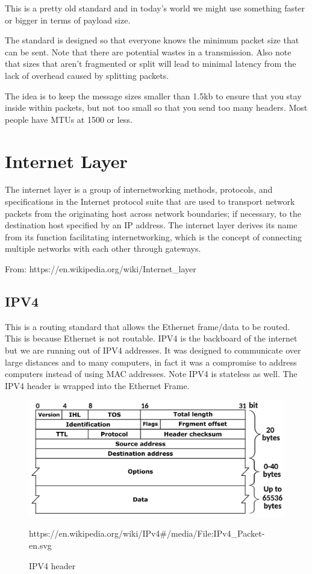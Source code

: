 \documentclass[../CMPUT-404-Notes.tex]{subfiles}
\begin{document}
\begin{Note}
  This is a pretty old standard and in today's world we might use something faster or bigger in terms of payload size.  
\end{Note}

The standard is designed so that everyone knows the minimum packet size that can be sent. 
Note that there are potential wastes in a transmission.
Also note that sizes that aren't fragmented or split will lead to minimal latency from the lack of overhead caused by splitting packets.

The idea is to keep the message sizes smaller than 1.5kb to ensure that you stay inside within packets, but not too small so that you send too many headers. Most people have MTUs at 1500 or less.


\section{Internet Layer}
\begin{quotebox}
  The internet layer is a group of internetworking methods, protocols, and specifications in the Internet protocol suite that are used to transport network packets from the originating host across network boundaries; if necessary, to the destination host specified by an IP address. The internet layer derives its name from its function facilitating internetworking, which is the concept of connecting multiple networks with each other through gateways.

  From: https://en.wikipedia.org/wiki/Internet\_layer
\end{quotebox}
\subsection{IPV4}
This is a routing standard that allows the Ethernet frame/data to be routed. This is because Ethernet is not routable. 
IPV4 is the backboard of the internet but we are running out of IPV4 addresses. 
It was designed to communicate over large distances and to many computers, in fact it was a compromise to address computers instead of using MAC addresses. 
Note IPV4 is stateless as well.
The IPV4 header is wrapped into the Ethernet Frame.

\begin{figure}[!h]
  \centering
  \includegraphics[width=\columnwidth]{../assets/IPv4-Packet-en.png}
  \caption{IPV4 header}
  \label{fig:-assets-IPv4-Packet-en-svg-png}
  https://en.wikipedia.org/wiki/IPv4\#/media/File:IPv4\_Packet-en.svg
\end{figure}
\end{document}
